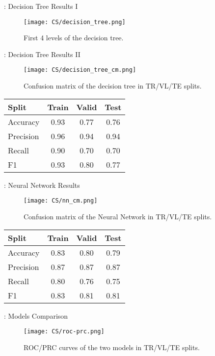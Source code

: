 \begin{frame}{\currentname: Decision Tree Results I}
    \begin{figure}
        \centering
        \texttt{[image: CS/decision\_tree.png]}
        \caption*{First 4 levels of the decision tree.}
    \end{figure}
\end{frame}

\begin{frame}{\currentname: Decision Tree Results II}
    \begin{figure}
        \centering
        \texttt{[image: CS/decision\_tree\_cm.png]}
        \caption*{Confusion matrix of the decision tree in TR/VL/TE splits.}
    \end{figure}
    \begin{table}[h]
        \centering
        \begin{tabular}{l|c|c|c|}
            Split & Train & Valid & Test \\
            \hline
            Accuracy  & 0.93 & 0.77 & 0.76 \\
            Precision & 0.96 & 0.94 & 0.94 \\
            Recall    & 0.90 & 0.70 & 0.70 \\
            F1        & 0.93 & 0.80 & 0.77 \\        
        \end{tabular}
    \end{table}
\end{frame}

\begin{frame}{\currentname: Neural Network Results}
    \begin{figure}
        \centering
        \texttt{[image: CS/nn\_cm.png]}
        \caption*{Confusion matrix of the Neural Network in TR/VL/TE splits.}
    \end{figure}    
    \begin{table}[h]
        \centering
        \begin{tabular}{l|c|c|c|}
            Split & Train & Valid & Test \\
            \hline
            Accuracy  & 0.83 & 0.80 & 0.79 \\
            Precision & 0.87 & 0.87 & 0.87 \\
            Recall    & 0.80 & 0.76 & 0.75 \\
            F1        & 0.83 & 0.81 & 0.81 \\        
        \end{tabular}
    \end{table}
\end{frame}

\begin{frame}{\currentname: Models Comparison}
    \begin{figure}
        \centering
        \texttt{[image: CS/roc-prc.png]}
        \caption*{ROC/PRC curves of the two models in TR/VL/TE splits.}
    \end{figure}
\end{frame}